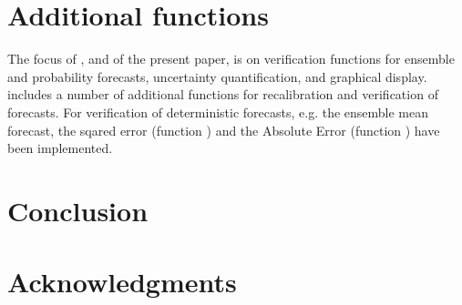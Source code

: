 \documentclass[article]{jss}\usepackage{graphicx, color}
\begin{document}
\section{Additional functions}

The focus of , and of the present paper, is on verification functions for ensemble and probability forecasts, uncertainty quantification, and graphical display.
 includes a number of additional functions for recalibration and verification of forecasts.
For verification of deterministic forecasts, e.g. the ensemble mean forecast, the sqared error (function ) and the Absolute Error (function ) have been implemented.





\section{Conclusion}

\section*{Acknowledgments}



\end{document}
